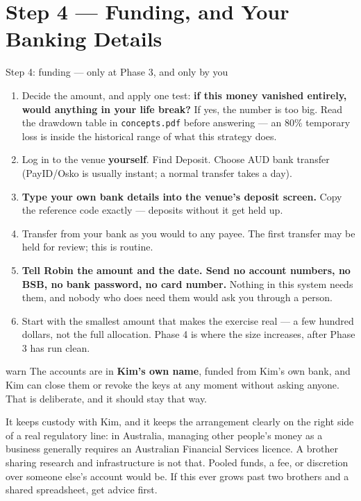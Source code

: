 \documentclass[11pt,a4paper]{article}
\begin{document}
\section{Step 4 --- Funding, and Your Banking Details}
\label{sec:banking}

\begin{kimbox}{Step 4: funding --- only at Phase 3, and only by you}
\begin{enumerate}[leftmargin=1.6em, itemsep=3pt]
    \item Decide the amount, and apply one test: \textbf{if this money
          vanished entirely, would anything in your life break?} If
          yes, the number is too big. Read the drawdown table in
          \texttt{concepts.pdf} before answering --- an $80\%$
          temporary loss is inside the historical range of what this
          strategy does.
    \item Log in to the venue \textbf{yourself}. Find Deposit. Choose
          AUD bank transfer (PayID/Osko is usually instant; a normal
          transfer takes a day).
    \item \textbf{Type your own bank details into the venue's deposit
          screen.} Copy the reference code exactly --- deposits
          without it get held up.
    \item Transfer from your bank as you would to any payee. The first
          transfer may be held for review; this is routine.
    \item \textbf{Tell Robin the amount and the date. Send no account
          numbers, no BSB, no bank password, no card number.} Nothing
          in this system needs them, and nobody who does need them
          would ask you through a person.
    \item Start with the smallest amount that makes the exercise real
          --- a few hundred dollars, not the full allocation. Phase 4
          is where the size increases, after Phase 3 has run clean.
\end{enumerate}
\end{kimbox}

\begin{resultbox}{warn}
The accounts are in \textbf{Kim's own name}, funded from Kim's own
bank, and Kim can close them or revoke the keys at any moment without
asking anyone. That is deliberate, and it should stay that way.

It keeps custody with Kim, and it keeps the arrangement clearly on the
right side of a real regulatory line: in Australia, managing other
people's money as a business generally requires an Australian
Financial Services licence. A brother sharing research and
infrastructure is not that. Pooled funds, a fee, or discretion over
someone else's account would be. If this ever grows past two brothers
and a shared spreadsheet, get advice first.
\end{resultbox}
\end{document}

